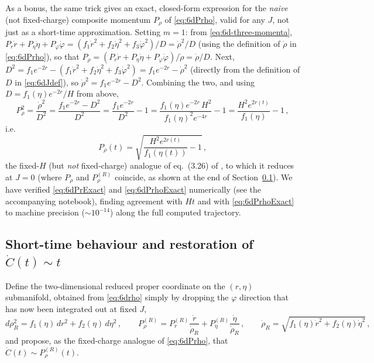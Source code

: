 \documentclass[11pt]{article}
\begin{document}
As a bonus, the same trick gives an exact, closed-form expression for the \emph{naive} (not fixed-charge) composite momentum $P_\rho$ of \eqref{eq:6dPrho}, valid for any $J$, not just as a short-time approximation. Setting $m=1$: from \eqref{eq:6d-three-momenta}, $P_r\dot r+P_\eta\dot\eta+P_\varphi\dot\varphi=(f_1\dot r^2+f_2\dot\eta^2+f_3\dot\varphi^2)/D=\dot\rho^2/D$ (using the definition of $\dot\rho$ in \eqref{eq:6dPrho}), so that $P_\rho=(P_r\dot r+P_\eta\dot\eta+P_\varphi\dot\varphi)/\dot\rho=\dot\rho/D$. Next, $D^2=f_1e^{-2r}-(f_1\dot r^2+f_2\dot\eta^2+f_3\dot\varphi^2)=f_1e^{-2r}-\dot\rho^2$ (directly from the definition of $D$ in \eqref{eq:6dJdef}), so $\dot\rho^2=f_1e^{-2r}-D^2$. Combining the two, and using $D=f_1(\eta)e^{-2r}/H$ from above,
\begin{equation}
P_\rho^2=\frac{\dot\rho^2}{D^2}=\frac{f_1e^{-2r}-D^2}{D^2}=\frac{f_1e^{-2r}}{D^2}-1=\frac{f_1(\eta)e^{-2r}\,H^2}{f_1(\eta)^2e^{-4r}}-1=\frac{H^2e^{2r(t)}}{f_1(\eta)}-1\,,
\end{equation}
i.e.
\begin{equation}
P_\rho(t)=\sqrt{\frac{H^2e^{2r(t)}}{f_1(\eta(t))}-1}\,,
\label{eq:6dPrhoExact}
\end{equation}
the fixed-$H$ (but \emph{not} fixed-charge) analogue of eq.~(3.26) of \cite{Fatemiabhari:2026rob}, to which it reduces at $J=0$ (where $P_\rho$ and $P_\rho^{(R)}$ coincide, as shown at the end of Section~\ref{subsec:6dshorttime}). We have verified \eqref{eq:6dPrExact} and \eqref{eq:6dPrhoExact} numerically (see the accompanying notebook), finding agreement with $Ht$ and with \eqref{eq:6dPrhoExact} to machine precision ($\sim10^{-14}$) along the full computed trajectory.

\subsection{Short-time behaviour and restoration of $\dot C(t)\sim t$}
\label{subsec:6dshorttime}

Define the two-dimensional reduced proper coordinate on the $(r,\eta)$ submanifold, obtained from \eqref{eq:6drho} simply by dropping the $\varphi$ direction that has now been integrated out at fixed $J$,
\begin{equation}
d\rho_R^2 = f_1(\eta)\,dr^2+f_2(\eta)\,d\eta^2\,,
\qquad
P_\rho^{(R)}
=
P_r^{(R)}\frac{\dot r}{\dot\rho_R}+P_\eta^{(R)}\frac{\dot\eta}{\dot\rho_R}\,,
\qquad
\dot\rho_R=\sqrt{f_1(\eta)\dot r^2+f_2(\eta)\dot\eta^2}\,,
\label{eq:6dPrhoR}
\end{equation}
and propose, as the fixed-charge analogue of \eqref{eq:6dPrho}, that $\dot C(t)\sim P_\rho^{(R)}(t)$.
\end{document}

